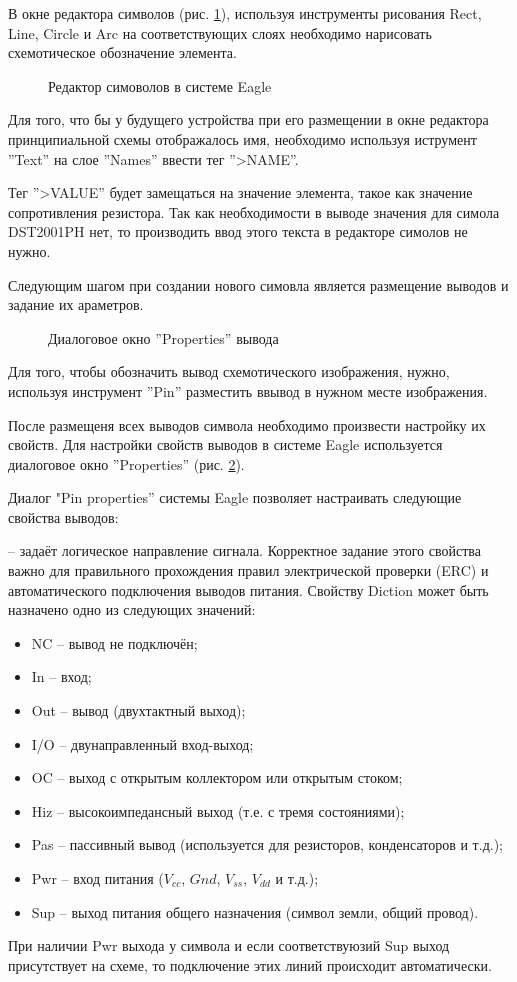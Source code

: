 В окне редактора символов (рис. \ref{img:symbol}), используя инструменты рисования
Rect, Line, Circle и Arc на соответствующих слоях необходимо нарисовать схемотическое
обозначение элемента.
\begin{figure}[h]
	\caption{Редактор симоволов в системе Eagle}
	\label{img:symbol}
\end{figure}
Для того, что бы у будущего устройства при его размещении в окне редактора принципиальной
схемы отображалось имя, необходимо используя иструмент ''Text'' на слое ''Names'' ввести
тег ''>NAME''.

Тег ''>VALUE'' будет замещаться на значение элемента, такое как значение
сопротивления резистора. Так как необходимости в выводе значения для симола DST2001PH нет,
то производить ввод этого текста в редакторе симолов не нужно.

Следующим шагом при создании нового симовла является размещение выводов и задание их
араметров.
\begin{figure}[h]
	\caption{Диалоговое окно ''Properties'' вывода}
	\label{img:pinProperty}
\end{figure}
Для того, чтобы обозначить вывод схемотического изображения, нужно, используя инструмент
''Pin'' разместить ввывод в нужном месте изображения.


После размещеня всех выводов символа необходимо произвести настройку их свойств.
Для настройки свойств выводов в системе Eagle используется диалоговое окно
''Properties'' (рис. \ref{img:pinProperty}).


Диалог "Pin properties'' системы Eagle позволяет настраивать следующие свойства выводов:

 -- задаёт логическое направление сигнала. Корректное задание этого свойства
важно для правильного прохождения правил электрической проверки (ERC) и автоматического
подключения выводов питания. Свойству Diction может быть назначено одно из следующих
значений:
\begin{itemize}
	\item{} NC  -- вывод не подключён;
	\item{} In  -- вход;
	\item{} Out -- вывод (двухтактный выход);
	\item{} I/O -- двунаправленный вход-выход;
	\item{} OC -- выход с открытым коллектором или открытым стоком;
	\item{} Hiz  -- высокоимпедансный выход (т.е. с тремя состояниями);
	\item{} Pas -- пассивный вывод (используется для резисторов, конденсаторов и т.д.);
	\item{} Pwr -- вход питания ($V_{cc}$, $Gnd$, $V_{ss}$, $V_{dd}$ и т.д.);
	\item{} Sup -- выход питания общего назначения (символ земли, общий провод).
\end{itemize}
При наличии Pwr выхода у символа и если соответствуюзий Sup выход присутствует на схеме,
то подключение этих линий происходит автоматически.


